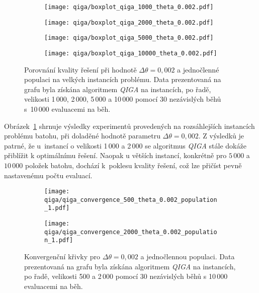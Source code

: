 \begin{figure}[ht!]
    \centering
    \begin{subfigure}[b]{0.24\textwidth}
      \texttt{[image: qiga/boxplot\_qiga\_1000\_theta\_0.002.pdf]}
    \end{subfigure}
    \hfill
    \begin{subfigure}[b]{0.24\textwidth}
        \texttt{[image: qiga/boxplot\_qiga\_2000\_theta\_0.002.pdf]}
    \end{subfigure}
    \hfill
    \begin{subfigure}[b]{0.24\textwidth}
        \texttt{[image: qiga/boxplot\_qiga\_5000\_theta\_0.002.pdf]}
    \end{subfigure}
    \hfill
    \begin{subfigure}[b]{0.24\textwidth}
        \texttt{[image: qiga/boxplot\_qiga\_10000\_theta\_0.002.pdf]}
    \end{subfigure}
  
    \caption{Porovnání kvality řešení při hodnotě $\Delta\theta = 0{,}002$ a jednočlenné populaci na velkých instancích problému. Data prezentovaná na grafu byla získána algoritmem \emph{QIGA} na instancích, po řadě, velikosti 1\,000, 2\,000, 5\,000 a 10\,000 pomocí 30 nezávislých běhů s~10\,000 evaluacemi na běh.}
    \label{fig:qiga-large}
\end{figure}

Obrázek~\ref{fig:qiga-large} shrnuje výsledky experimentů provedených na rozsáhlejších instancích problému batohu, při doladěné hodnotě parametru $\Delta\theta = 0{,}002$. 
Z výsledků je patrné, že u~instancí o velikosti 1\,000 a 2\,000 se algoritmus \emph{QIGA} stále dokáže přiblížit k optimálnímu řešení. 
Naopak u větších instancí, konkrétně pro $5\,000$ a $10\,000$ položek batohu, dochází k~poklesu kvality řešení, což lze přičíst pevně nastavenému počtu evaluací. 

\begin{figure}[ht!]
    \centering
    \begin{subfigure}[b]{0.48\textwidth}
      \texttt{[image: qiga/qiga\_convergence\_500\_theta\_0.002\_population\_1.pdf]}
    \end{subfigure}
    \hfill
    \begin{subfigure}[b]{0.48\textwidth}
        \texttt{[image: qiga/qiga\_convergence\_2000\_theta\_0.002\_population\_1.pdf]}
    \end{subfigure}
    \caption{Konvergenční křivky pro $\Delta\theta = 0{,}002$ a jednočlennou populaci. Data prezentovaná na grafu byla získána algoritmem \emph{QIGA} na instancích, po řadě, velikosti 500 a 2\,000 pomocí 30 nezávislých běhů s 10\,000 evaluacemi na běh.}
    \label{fig:qiga-convergence}
\end{figure}

